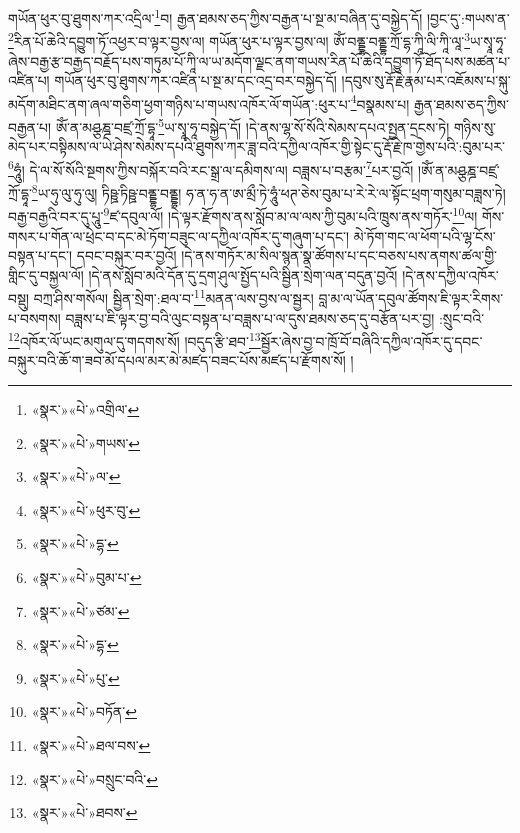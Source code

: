 གཡོན་ཕུར་བུ་ཐུགས་ཀར་འདྲིལ་\footnote{«སྣར་»«པེ་»འགྲིལ་}བ། རྒྱན་ཐམས་ཅད་ཀྱིས་བརྒྱན་པ་སྔ་མ་བཞིན་དུ་བསྐྱེད་དོ། །བྱང་དུ་:གཡས་ན་\footnote{«སྣར་»«པེ་»གཡས་}རིན་པོ་ཆེའི་དབྱུག་ཏོ་འཕྱར་བ་ལྟར་བྱས་ལ། གཡོན་ཕུར་པ་ལྟར་བྱས་ལ། ཨོཾ་བནྡྷ་བནྡྷ་ཀྲོ་དྷ་ཀཱི་ལི་ཀཱི་ལཱ་\footnote{«སྣར་»«པེ་»ལ་}ཡ་སྭཱ་ཧཱ་ཞེས་བརྒྱ་རྩ་བརྒྱད་བརྗོད་པས་གཏུམ་པོ་ཀཱི་ལ་ཡ་མདོག་ལྗང་ནག་གཡས་རིན་པོ་ཆེའི་དབྱུག་ཏོ་ཐོད་པས་མཚན་པ་འཛིན་པ། གཡོན་ཕུར་བུ་ཐུགས་ཀར་འཛིན་པ་སྔ་མ་དང་འདྲ་བར་བསྐྱེད་དོ། །དབུས་སུ་རྡོ་རྗེ་རྣམ་པར་འཇོམས་པ་སྐུ་མདོག་མཐིང་ནག་ཞལ་གཅིག་ཕྱག་གཉིས་པ་གཡས་འཁོར་ལོ་གཡོན་:ཕུར་པ་\footnote{«སྣར་»«པེ་»ཕུར་བུ་}བསྣམས་པ། རྒྱན་ཐམས་ཅད་ཀྱིས་བརྒྱན་པ། ཨོཾ་ན་མཤྩཎྜ་བཛྲ་ཀྲོ་དྷཱ་\footnote{«སྣར་»«པེ་»དྷ་}ཡ་སྭཱ་ཧཱ་བསྐྱེད་དོ། །དེ་ནས་ལྷ་སོ་སོའི་སེམས་དཔའ་སྤྱན་དྲངས་ཏེ། གཉིས་སུ་མེད་པར་བསྟིམས་ལ་ཡེ་ཤེས་སེམས་དཔའི་ཐུགས་ཀར་ཟླ་བའི་དཀྱིལ་འཁོར་གྱི་སྟེང་དུ་རྡོ་རྗེ་ཁ་གྱེས་པའི་:བུམ་པར་\footnote{«སྣར་»«པེ་»བུམ་པ་}ཧཱུཾ། དེ་ལ་སོ་སོའི་སྔགས་ཀྱིས་བསྐོར་བའི་རང་སྒྲ་ལ་དམིགས་ལ། བཟླས་པ་བརྩམ་\footnote{«སྣར་»«པེ་»ཙམ་}པར་བྱའོ། །ཨོཾ་ན་མཤྩཎྜ་བཛྲ་ཀྲོ་དྷཱ་\footnote{«སྣར་»«པེ་»དྷ་}ཡ་ཧུ་ལུ་ཧུ་ལུ། ཏིཥྛ་ཏིཥྛ་བནྡྷ་བནྡྷ། ཧ་ན་ཧ་ན་ཨ་མྲྀ་ཏེ་ཧཱུཾ་ཕཊ་ཅེས་བུམ་པ་རེ་རེ་ལ་སྟོང་ཕྲག་གསུམ་བཟླས་ཏེ། བརྒྱ་བརྒྱའི་བར་དུ་པཱུ་\footnote{«སྣར་»«པེ་»པུ་}ཛ་དབུལ་ལོ། །དེ་ལྟར་རྫོགས་ནས་སློབ་མ་ལ་ལས་ཀྱི་བུམ་པའི་ཁྲུས་ནས་གཏོར་\footnote{«སྣར་»«པེ་»བཏོན་}ལ། གོས་གསར་པ་གོན་ལ་ཕྲེང་བ་དང་མེ་ཏོག་བཟུང་ལ་དཀྱིལ་འཁོར་དུ་གཞུག་པ་དང་། མེ་ཏོག་གང་ལ་ཕོག་པའི་ལྷ་ངོས་བསྟན་པ་དང་། དབང་བསྐུར་བར་བྱའོ། །དེ་ནས་གཏོར་མ་སིལ་སྙན་སྣ་ཚོགས་པ་དང་བཅས་པས་ནགས་ཚལ་གྱི་གླིང་དུ་བསྐྱལ་ལོ། །དེ་ནས་སློབ་མའི་དོན་དུ་དྲག་ཤུལ་སྤྱོད་པའི་སྦྱིན་སྲེག་ལན་བདུན་བྱའོ། །དེ་ནས་དཀྱིལ་འཁོར་བསྡུ། བཀྲ་ཤིས་གསོལ། སྦྱིན་སྲེག་:ཐལ་བ་\footnote{«སྣར་»«པེ་»ཐལ་བས་}མནན་ལས་བྱས་ལ་སྦྱར། བླ་མ་ལ་ཡོན་དབུལ་ཚོགས་ཇི་ལྟར་རིགས་པ་བསགས། བཟླས་པ་ཇི་ལྟར་བྱ་བའི་ལུང་བསྟན་པ་བཟླས་པ་ལ་དུས་ཐམས་ཅད་དུ་བརྩོན་པར་བྱ། :སྲུང་བའི་\footnote{«སྣར་»«པེ་»བསྲུང་བའི་}འཁོར་ལོ་ཡང་མགུལ་དུ་གདགས་སོ། །བདུད་རྩི་ཐབ་\footnote{«སྣར་»«པེ་»ཐབས་}སྦྱོར་ཞེས་བྱ་བ་ཁྲོ་བོ་བཞིའི་དཀྱིལ་འཁོར་དུ་དབང་བསྐུར་བའི་ཆོ་ག་ཟབ་མོ་དཔལ་མར་མེ་མཛད་བཟང་པོས་མཛད་པ་རྫོགས་སོ། ། 
